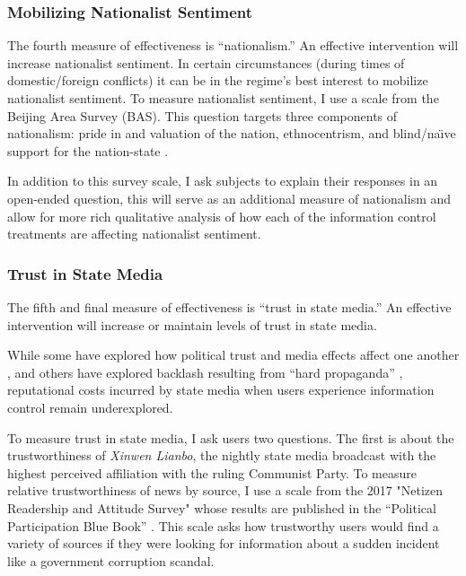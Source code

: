 \documentclass[11pt]{article}
\begin{document}
\subsubsection{Mobilizing Nationalist Sentiment}

The fourth measure of effectiveness is ``nationalism.'' An effective intervention will increase nationalist sentiment. In certain circumstances (during times of domestic/foreign conflicts) it can be in the regime's best interest to mobilize nationalist sentiment. To measure nationalist sentiment, I use a scale from the Beijing Area Survey (BAS). This question targets three components of nationalism: pride in and valuation of the nation, ethnocentrism, and blind/na\"{\i}ve support for the nation-state \citep{johnston2017chinese}.

In addition to this survey scale, I ask subjects to explain their responses in an open-ended question, this will serve as an additional measure of nationalism and allow for more rich qualitative analysis of how each of the information control treatments are affecting nationalist sentiment.

\subsubsection{Trust in State Media}

The fifth and final measure of effectiveness is ``trust in state media.'' An effective intervention will increase or maintain levels of trust in state media.

While some have explored how political trust and media effects affect one another \citep{chen2001media,cai2018media}, and others have explored backlash resulting from ``hard propaganda'' \citep{huang2014propaganda, huang2016media}, reputational costs incurred by state media when users experience information control remain underexplored.

To measure trust in state media, I ask users two questions. The first is about the trustworthiness of {\it Xinwen Lianbo}, the nightly state media broadcast with the highest perceived affiliation with the ruling Communist Party. To measure relative trustworthiness of news by source, I use a scale from the 2017 "Netizen Readership and Attitude Survey" whose results are published in the ``Political Participation Blue Book'' \citep{ma2017zhengzhi}. This scale asks how trustworthy users would find a variety of sources if they were looking for information about a sudden incident like a government corruption scandal.
\end{document}

